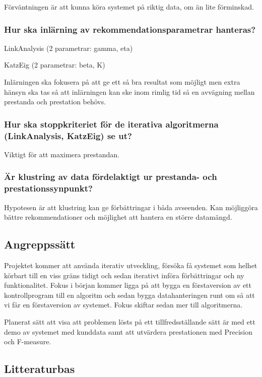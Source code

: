 \documentclass[11pt]{article}
\begin{document}
Förväntningen är att kunna köra systemet på riktig data, om än lite förminskad.


\subsubsection*{Hur ska inlärning av rekommendationsparametrar hanteras?}

LinkAnalysis (2 parametrar: gamma, eta)

KatzEig (2 parametrar: beta, K)

Inlärningen ska fokusera på att ge ett så bra resultat som möjligt men extra hänsyn ska tas så att inlärningen kan ske inom rimlig tid så en avvägning mellan prestanda och prestation behövs.


\subsubsection*{Hur ska stoppkriteriet för de iterativa algoritmerna (LinkAnalysis, KatzEig) se ut?}

Viktigt för att maximera prestandan.


\subsubsection*{Är klustring av data fördelaktigt ur prestanda- och prestationssynpunkt?}

Hypotesen är att klustring kan ge förbättringar i båda avseenden. Kan möjliggöra bättre rekommendationer och möjlighet att hantera en större datamängd.


\subsection*{Angreppssätt}

Projektet kommer att använda iterativ utveckling, försöka få systemet som helhet körbart till en viss gräns tidigt och sedan iterativt införa förbättringar och ny funktionalitet. Fokus i början kommer ligga på att bygga en förstaversion av ett kontrollprogram till en algoritm och sedan bygga datahanteringen runt om så att vi får en förstaversion av systemet. Fokus skiftar sedan mer till algoritmerna.

Planerat sätt att visa att problemen lösts på ett tillfredsställande sätt är med ett demo av systemet med kunddata samt att utvärdera prestationen med Precision och F-measure.


\newpage


\subsection*{Litteraturbas}
\end{document}
